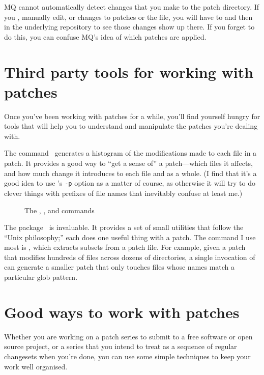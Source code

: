 MQ cannot automatically detect changes that you make to the patch
directory.  If you , manually edit, or 
changes to patches or the  file, you will have to
 and then
 in the underlying repository to
see those changes show up there.  If you forget to do this, you can
confuse MQ's idea of which patches are applied.

\section{Third party tools for working with patches}
\label{sec:mq:tools}

Once you've been working with patches for a while, you'll find
yourself hungry for tools that will help you to understand and
manipulate the patches you're dealing with.

The  command~\cite{web:diffstat} generates a
histogram of the modifications made to each file in a patch.  It
provides a good way to ``get a sense of'' a patch---which files it
affects, and how much change it introduces to each file and as a
whole.  (I find that it's a good idea to use 's
\texttt{-p} option as a matter of course, as otherwise it will try to
do clever things with prefixes of file names that inevitably confuse
at least me.)

\begin{figure}[ht]
  \caption{The , , and  commands}
  \label{ex:mq:tools}
\end{figure}

The  package~\cite{web:patchutils} is invaluable.
It provides a set of small utilities that follow the ``Unix
philosophy;'' each does one useful thing with a patch.  The
 command I use most is , which
extracts subsets from a patch file.  For example, given a patch that
modifies hundreds of files across dozens of directories, a single
invocation of  can generate a smaller patch that
only touches files whose names match a particular glob pattern.

\section{Good ways to work with patches}

Whether you are working on a patch series to submit to a free software
or open source project, or a series that you intend to treat as a
sequence of regular changesets when you're done, you can use some
simple techniques to keep your work well organised.

